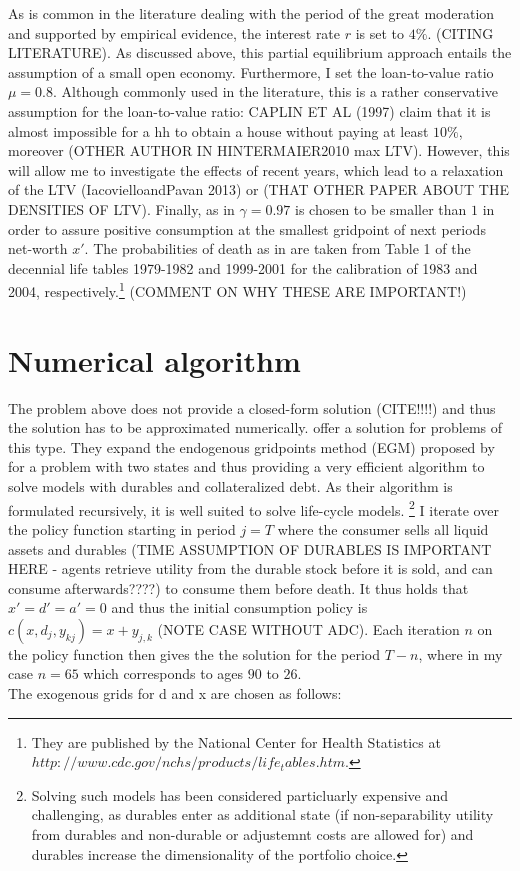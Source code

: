 \documentclass[a4paper,12pt,legno]{article}
\begin{document}
As is common in the literature dealing with the period of the great moderation and supported by empirical evidence, the interest rate $r$ is set to $4\%$. (CITING LITERATURE). As discussed above, this partial equilibrium approach entails the assumption of a small open economy. Furthermore, I set the loan-to-value ratio $\mu = 0.8$. Although commonly used in the literature, this is a rather conservative assumption for the loan-to-value ratio: CAPLIN ET AL (1997) claim that it is almost impossible for a hh to obtain a house without paying at least $10\%$, moreover (OTHER AUTHOR IN HINTERMAIER2010 max LTV). However, this will allow me to investigate the effects of recent years, which lead to a relaxation of the LTV (IacovielloandPavan 2013) or (THAT OTHER PAPER ABOUT THE DENSITIES OF LTV). Finally, as in \cite{hintermaier2010} $\gamma = 0.97$ is chosen to be smaller than $1$ in order to assure positive consumption at the smallest gridpoint of next periods net-worth $x'$. The probabilities of death as in \cite{hintermaier2011} are taken from Table 1 of the decennial life tables 1979-1982 and 1999-2001 for the calibration of 1983 and 2004, respectively.\footnote{They are published by the National Center for Health Statistics at $http://www.cdc.gov/nchs/products/life_tables.htm$.} (COMMENT ON WHY THESE ARE IMPORTANT!)

\section{Numerical algorithm}

The problem above does not provide a closed-form solution (CITE!!!!) and thus the solution has to be approximated numerically. \cite{hintermaier2010} offer a solution for problems of this type. They expand the endogenous gridpoints method (EGM) proposed by \cite{carroll2006} for a problem with two states and thus providing a very efficient algorithm to solve models with durables and collateralized debt. As their algorithm is formulated recursively, it is well suited to solve life-cycle models. \footnote{Solving such models has been considered particluarly expensive and challenging, as durables enter as additional state (if non-separability utility from durables and non-durable or adjustemnt costs are allowed for) and durables increase the dimensionality of the portfolio choice.\citep{hintermaier2010}} I iterate over the policy function starting in period $j = T$ where the consumer sells all liquid assets and durables (TIME ASSUMPTION OF DURABLES IS IMPORTANT HERE - agents retrieve utility from the durable stock before it is sold, and can consume afterwards????) to consume them before death. It thus holds that $x'=d'=a'=0$ and thus the initial consumption policy is $c(x,d_{j},y_{kj})=x+y_{j,k}$ (NOTE CASE WITHOUT ADC). Each iteration $n$ on the policy function then gives the the solution for the period $T-n$, where in my case $n=65$ which corresponds to ages $90$ to $26$. \\
The exogenous grids for d and x are chosen as follows: 
\end{document}
